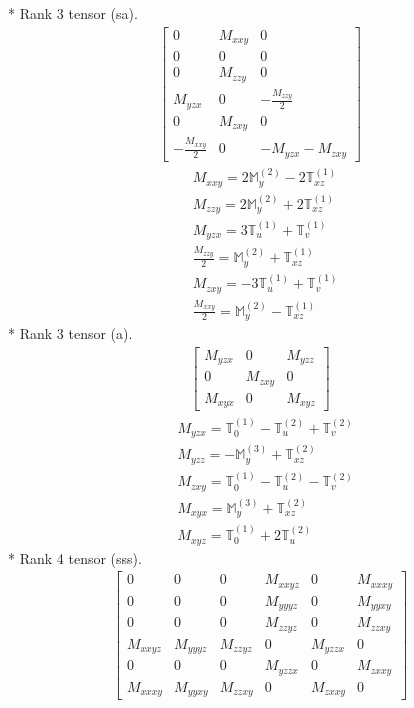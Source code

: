 \documentclass[fleqn,8pt,landscape]{jsarticle}
\begin{document}
* Rank 3 tensor (sa).
\begin{align*}
\begin{bmatrix} 0 & M_{xxy} & 0 \\ 0 & 0 & 0 \\ 0 & M_{zzy} & 0 \\ M_{yzx} & 0 & - \frac{M_{zzy}}{2} \\ 0 & M_{zxy} & 0 \\ - \frac{M_{xxy}}{2} & 0 & - M_{yzx} - M_{zxy} \end{bmatrix}
\end{align*}
\begin{align*}
& M_{xxy} = 2 \mathbb{M}_{y}^{(2)} - 2 \mathbb{T}_{xz}^{(1)} \\
& M_{zzy} = 2 \mathbb{M}_{y}^{(2)} + 2 \mathbb{T}_{xz}^{(1)} \\
& M_{yzx} = 3 \mathbb{T}_{u}^{(1)} + \mathbb{T}_{v}^{(1)} \\
& \frac{M_{zzy}}{2} = \mathbb{M}_{y}^{(2)} + \mathbb{T}_{xz}^{(1)} \\
& M_{zxy} = - 3 \mathbb{T}_{u}^{(1)} + \mathbb{T}_{v}^{(1)} \\
& \frac{M_{xxy}}{2} = \mathbb{M}_{y}^{(2)} - \mathbb{T}_{xz}^{(1)}
\end{align*}
* Rank 3 tensor (a).
\begin{align*}
\begin{bmatrix} M_{yzx} & 0 & M_{yzz} \\ 0 & M_{zxy} & 0 \\ M_{xyx} & 0 & M_{xyz} \end{bmatrix}
\end{align*}
\begin{align*}
& M_{yzx} = \mathbb{T}_{0}^{(1)} - \mathbb{T}_{u}^{(2)} + \mathbb{T}_{v}^{(2)} \\
& M_{yzz} = - \mathbb{M}_{y}^{(3)} + \mathbb{T}_{xz}^{(2)} \\
& M_{zxy} = \mathbb{T}_{0}^{(1)} - \mathbb{T}_{u}^{(2)} - \mathbb{T}_{v}^{(2)} \\
& M_{xyx} = \mathbb{M}_{y}^{(3)} + \mathbb{T}_{xz}^{(2)} \\
& M_{xyz} = \mathbb{T}_{0}^{(1)} + 2 \mathbb{T}_{u}^{(2)}
\end{align*}
* Rank 4 tensor (sss).
\begin{align*}
\begin{bmatrix} 0 & 0 & 0 & M_{xxyz} & 0 & M_{xxxy} \\ 0 & 0 & 0 & M_{yyyz} & 0 & M_{yyxy} \\ 0 & 0 & 0 & M_{zzyz} & 0 & M_{zzxy} \\ M_{xxyz} & M_{yyyz} & M_{zzyz} & 0 & M_{yzzx} & 0 \\ 0 & 0 & 0 & M_{yzzx} & 0 & M_{zxxy} \\ M_{xxxy} & M_{yyxy} & M_{zzxy} & 0 & M_{zxxy} & 0 \end{bmatrix}
\end{align*}
\end{document}
